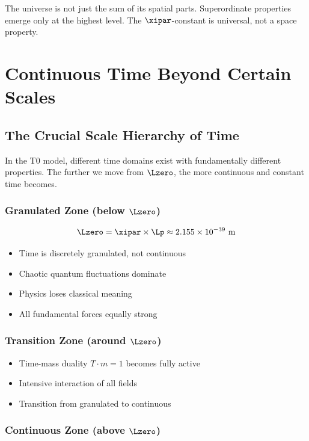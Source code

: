 	The universe is not just the sum of its spatial parts. Superordinate properties emerge only at the highest level. The $\xipar$-constant is universal, not a space property.
	
	\section{Continuous Time Beyond Certain Scales}
	
	\subsection{The Crucial Scale Hierarchy of Time}
	
	In the T0 model, different time domains exist with fundamentally different properties. The further we move from $\Lzero$, the more continuous and constant time becomes.
	
	\subsubsection{Granulated Zone (below $\Lzero$)}
	
	\begin{equation}
		\Lzero = \xipar \times \Lp \approx 2.155 \times 10^{-39} \text{ m}
	\end{equation}
	
	\begin{itemize}
		\item Time is discretely granulated, not continuous
		\item Chaotic quantum fluctuations dominate
		\item Physics loses classical meaning
		\item All fundamental forces equally strong
	\end{itemize}
	
	\subsubsection{Transition Zone (around $\Lzero$)}
	
	\begin{itemize}
		\item Time-mass duality $T \cdot m = 1$ becomes fully active
		\item Intensive interaction of all fields
		\item Transition from granulated to continuous
	\end{itemize}
	
	\subsubsection{Continuous Zone (above $\Lzero$)}
	
